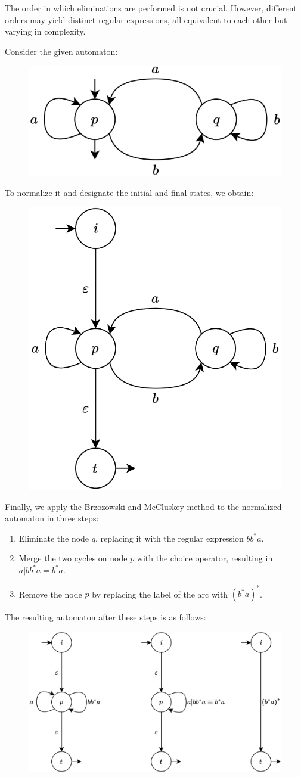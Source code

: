 The order in which eliminations are performed is not crucial. 
However, different orders may yield distinct regular expressions, all equivalent to each other but varying in complexity.
\begin{example}
    Consider the given automaton:
    \begin{figure}[H]
        \centering
        \includegraphics[width=0.35\linewidth]{images/br1.png}
    \end{figure}
    To normalize it and designate the initial and final states, we obtain:
    \begin{figure}[H]
        \centering
        \includegraphics[width=0.35\linewidth]{images/br2.png}
    \end{figure}
    Finally, we apply the Brzozowski and McCluskey method to the normalized automaton in three steps:
    \begin{enumerate}
        \item Eliminate the node $q$, replacing it with the regular expression $bb^{*}a$.
        \item Merge the two cycles on node $p$ with the choice operator, resulting in $a|bb^{*}a=b^{*}a$. 
        \item Remove the node $p$ by replacing the label of the arc with $(b^{*}a)^{*}$. 
    \end{enumerate}
    The resulting automaton after these steps is as follows:
    \begin{figure}[H]
        \centering
        \includegraphics[width=0.65\linewidth]{images/br3.png}
    \end{figure}
\end{example}